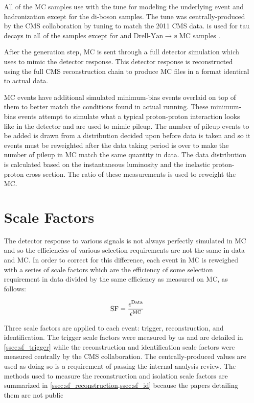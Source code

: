 All of the MC samples use \PYTHIAsix with the \ZTwoStar tune for modeling the
underlying event and hadronization except for the di-boson samples. The
\ZTwoStar tune was centrally-produced by the CMS collaboration by tuning
\PYTHIAsix to match the 2011 CMS data. \Tauola is used for tau decays in all of
the samples except for \ttbar and \POWHEG $\text{Drell-Yan} \to \ee$ MC samples
\cite{was_2007}.



After the generation step, MC is sent through a full detector simulation which
uses \GEANTfour \cite{agostinelli2003} to mimic the detector response. This
detector response is reconstructed using the full CMS reconstruction chain to
produce MC files in a format identical to actual data.

MC events have additional simulated minimum-bias events overlaid on top of them
to better match the conditions found in actual running. These minimum-bias
events attempt to simulate what a typical proton-proton interaction looks like
in the detector and are used to mimic pileup. The number of pileup events to be
added is drawn from a distribution decided upon before data is taken and so it
events must be reweighted after the data taking period is over to make the
number of pileup in MC match the same quantity in data. The data distribution
is calculated based on the instantaneous luminosity and the inelastic
proton-proton cross section. The ratio of these measurements is used to
reweight the MC.

\section{Scale Factors}
\label{sec:scale_factors}

The detector response to various signals is not always perfectly simulated in
MC and so the efficiencies of various selection requirements are not the same
in data and MC. In order to correct for this difference, each event in MC is
reweighed with a series of scale factors which are the efficiency of some
selection requirement in data divided by the same efficiency as measured on MC,
as follows:

\begin{equation}
    \label{eq:sf}
    \text{SF} = \frac{\epsilon^{\text{Data}}}{\epsilon^{\text{MC}}}
\end{equation}

Three scale factors are applied to each event: trigger, reconstruction, and
identification. The trigger scale factors were measured by us and are detailed
in \cref{ssec:sf_trigger} while the reconstruction and identification scale
factors were measured centrally by the CMS collaboration. The
centrally-produced values are used as doing so is a requirement of passing the
internal analysis review. The methods used to measure the reconstruction and
isolation scale factors are summarized in
\cref{ssec:sf_reconstruction,ssec:sf_id} because the papers detailing them are
not public

